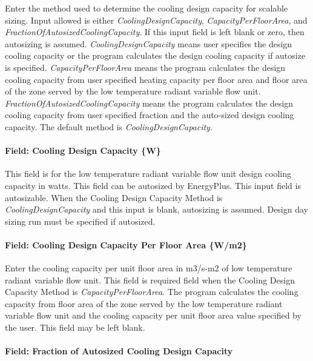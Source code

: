 Enter the method used to determine the cooling design capacity for scalable sizing. Input allowed is either \emph{CoolingDesignCapacity}, \emph{CapacityPerFloorArea}, and \emph{FractionOfAutosizedCoolingCapacity}. If this input field is left blank or zero, then autosizing is assumed. \emph{CoolingDesignCapacity} means user specifies the design cooling capacity or the program calculates the design cooling capacity if autosize is specified. \emph{CapacityPerFloorArea} means the program calculates the design cooling capacity from user specified heating capacity per floor area and floor area of the zone served by the low temperature radiant variable flow unit. \emph{FractionOfAutosizedCoolingCapacity} means the program calculates the design cooling capacity from user specified fraction and the auto-sized design cooling capacity. The default method is \emph{CoolingDesignCapacity}.

\paragraph{Field: Cooling Design Capacity \{W\}}\label{field-cooling-design-capacity-w-000}

This field is for the low temperature radiant variable flow unit design cooling capacity in watts. This field can be autosized by EnergyPlus. This input field is autosizable. When the Cooling Design Capacity Method is \emph{CoolingDesignCapacity} and this input is blank, autosizing is assumed. Design day sizing run must be specified if autosized.

\paragraph{Field: Cooling Design Capacity Per Floor Area \{W/m2\}}\label{field-cooling-design-capacity-per-floor-area-wm2-000}

Enter the cooling capacity per unit floor area in m3/s-m2 of low temperature radiant variable flow unit. This field is required field when the Cooling Design Capacity Method is \emph{CapacityPerFloorArea}. The program calculates the cooling capacity from floor area of the zone served by the low temperature radiant variable flow unit and the cooling capacity per unit floor area value specified by the user. This field may be left blank.

\paragraph{Field: Fraction of Autosized Cooling Design Capacity}\label{field-fraction-of-autosized-cooling-design-capacity-000}


